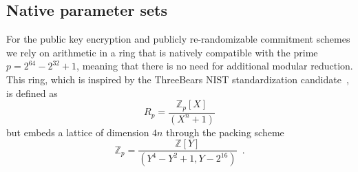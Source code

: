 \begin{comment}
To use the above transformations, we are left with multiplication in the rings $\Z_q[x]/(x^3 - r_i)$.  Given
two elements $a(x) = a_0 + a_1 x + a_2 x^2$ and $b(x) = b_0 + b_1 x + b_2 x^2$, we could compute 
the product using Toom-Cook in 5 multiplications, but the interpolation step requires division by $6$
which would amount to a multiplication or to a seperate routine executing division by 3 and a shift.
To avoid this, we use a two step Karatsuba multiply:
\bit
\item Compute $c_0 = a_0b_0$, $c_1 = a_1 b_1$, $c_2 = a_2 b_2$
\item Compute $d_0 = (a_0 + a_1) (b_0 + b_1)$ and $d_1 = (a_1 + a_2)(b_1 + b_2)$ and $d_2 = (a_0 + a_1 + a_2)(b_0 + b_1 + b_2)$
\eit
The the product polynomial is given by:
\[
[c_0,  d_0 - c_0 - c_1,   d_2 - d_0 - d_1 + 2c_1,    d_1 - c_1 - c_2,   c_2] \, .
\]
These formulae need 6 multiplications and 14 additions to compute the product.  
Of course, we still have to reduce mod
$x^3 - r_i$, which gives another 2 multiplications and 2 additions, so a total of 8 multiplications and 16 additions.

To multiply two elements in the ring $R_{p, 9, n}$ we therefore require:
\bit
\item Two mappings to the product ring, which constists of $n$ rings of degree $3$
\item $n$ multiplications of degree 2 elements in such rings, totalling $8n$ mults and $16n$ additions
\item One inverse mapping to the polynomial ring
\eit
The overall cost therefore is:
\[   25n + 9n/2 \log_2(n/2) \text{ multiplications and }    6n \log_2(n/2) + 22 n \text{ additions } \, .   \]
Using the embedding strategy in the ring of dimension $4n$ would give
\[  64n + 12n \log_2(n/2) \text{ multiplications and }  12n \log_2(n/2) + 36n \text{ additions } \, . \]

Example: for $n = 64$ we thus obtain 3032 multiplications vs.\ 7936 multiplications for the embedding strategy.
\end{comment}

\subsection{Native parameter sets}
\label{section:native-parameter-sets}

For the public key encryption and publicly re-randomizable commitment schemes we rely on arithmetic in a ring that is natively compatible with the prime $p = 2^{64} - 2^{32} + 1$, meaning that there is no need for additional modular reduction. This ring, which is inspired by the ThreeBears NIST standardization candidate~\cite{threebears}, is defined as 
$$ R_p = \frac{\mathbb{Z}_p[X]}{(X^n+1)} $$
but embeds a lattice of dimension $4n$ through the packing scheme
$$ \mathbb{Z}_p = \frac{\mathbb{Z}[Y]}{(Y^4 - Y^2 + 1, Y-2^{16})} \enspace .$$

